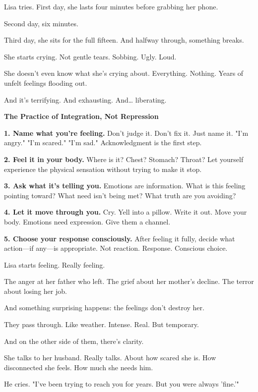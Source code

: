 \documentclass[11pt,twoside]{book}
\begin{document}
Lisa tries. First day, she lasts four minutes before grabbing her phone.

Second day, six minutes.

Third day, she sits for the full fifteen. And halfway through, something breaks.

She starts crying. Not gentle tears. Sobbing. Ugly. Loud.

She doesn't even know what she's crying about. Everything. Nothing. Years of unfelt feelings flooding out.

And it's terrifying. And exhausting. And\ldots{} liberating.

\begin{practicebox}
\textbf{The Practice of Integration, Not Repression}

\textbf{1. Name what you're feeling.} Don't judge it. Don't fix it. Just name it. "I'm angry." "I'm scared." "I'm sad." Acknowledgment is the first step.

\textbf{2. Feel it in your body.} Where is it? Chest? Stomach? Throat? Let yourself experience the physical sensation without trying to make it stop.

\textbf{3. Ask what it's telling you.} Emotions are information. What is this feeling pointing toward? What need isn't being met? What truth are you avoiding?

\textbf{4. Let it move through you.} Cry. Yell into a pillow. Write it out. Move your body. Emotions need expression. Give them a channel.

\textbf{5. Choose your response consciously.} After feeling it fully, decide what action—if any—is appropriate. Not reaction. Response. Conscious choice.
\end{practicebox}

Lisa starts feeling. Really feeling.

The anger at her father who left. The grief about her mother's decline. The terror about losing her job.

And something surprising happens: the feelings don't destroy her.

They pass through. Like weather. Intense. Real. But temporary.

And on the other side of them, there's clarity.

She talks to her husband. Really talks. About how scared she is. How disconnected she feels. How much she needs him.

He cries. "I've been trying to reach you for years. But you were always 'fine.'"
\end{document}
